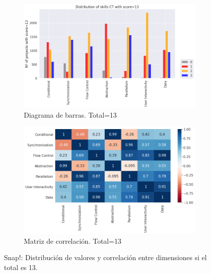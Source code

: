 \documentclass[a4paper, 12pt]{book}
\begin{document}
\begin{figure}[H]
    \centering
    \begin{subfigure}[h]{.49\textwidth} 
        \includegraphics[width=\textwidth]{img/distribucion_13_Snap}
        \caption{Diagrama de barras. Total=13}
        \label{fig:total13_Snap}
    \end{subfigure}       
    \begin{subfigure}[h]{.49\textwidth} 
        \includegraphics[width=\textwidth]{img/corr_13_Snap}
        \caption{Matriz de correlación. Total=13}
        \label{fig:corr13_Snap}
    \end{subfigure}
    \caption{Snap!: Distribución de valores y correlación entre dimensiones si el total es 13.}
\end{figure}
\end{document}
